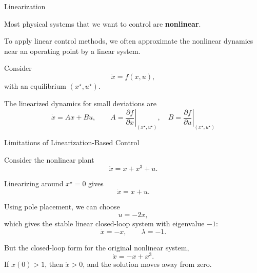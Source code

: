 \documentclass{beamer}
\begin{document}
\begin{frame}{Linearization}
	\begin{flushleft}
		
		Most physical systems that we want to control are \textbf{nonlinear}.
		
		To apply linear control methods, we often approximate the nonlinear
		dynamics near an operating point by a linear system.
		
		Consider
		\[
		\dot{x}=f(x,u),
		\]
		with an equilibrium \((x^\star,u^\star)\).
		
		The linearized dynamics for small deviations are
		\[
		\dot{x}=Ax+Bu,
		\qquad
		A=\left.\frac{\partial f}{\partial x}\right|_{(x^\star,u^\star)},
		\quad
		B=\left.\frac{\partial f}{\partial u}\right|_{(x^\star,u^\star)}
		\]
		
	\end{flushleft}
\end{frame}

\begin{frame}{Limitations of Linearization-Based Control}
	\begin{flushleft}
		
		Consider the nonlinear plant
		\[
		\dot{x}=x+x^3+u.
		\]
		
		Linearizing around \(x^\star=0\) gives
		\[
		\dot{x}=x+u.
		\]
		
		Using pole placement, we can choose
		\[
		u=-2x,
		\]
		\hspace{-0.7cm} which gives the stable linear closed-loop system with eigenvalue \(-1\):
		\[
		\dot{x}=-x,
		\qquad \lambda=-1.
		\]
		
		But the closed-loop form for the original nonlinear system,
		\[
		\dot{x}=-x+x^3.
		\]
		If \(x(0)>1\), then \(\dot{x}>0\), and the solution moves away from zero.
		
	\end{flushleft}
\end{frame}
\end{document}
